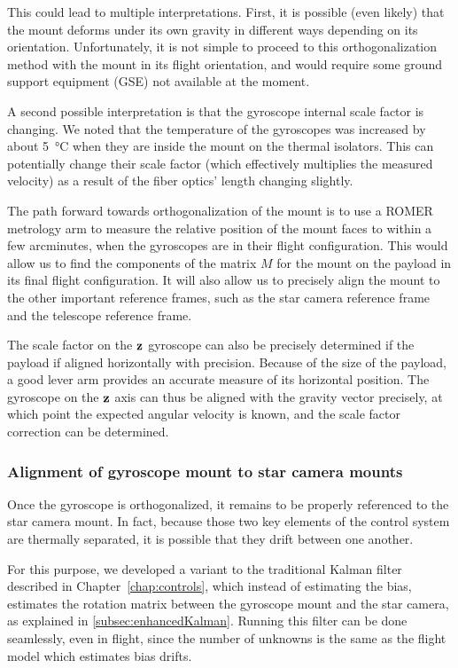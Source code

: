 This could lead to multiple interpretations. First, it is possible (even likely) that the mount deforms under its own gravity in different ways depending on its orientation. Unfortunately, it is not simple to proceed to this orthogonalization method with the mount in its flight orientation, and would require some ground support equipment (GSE) not available at the moment. 

A second possible interpretation is that the gyroscope internal scale factor is changing. We noted that the temperature of the gyroscopes was increased by about \SI{5}{\degreeCelsius} when they are inside the mount on the thermal isolators. This can potentially change their scale factor (which effectively multiplies the measured velocity) as a result of the fiber optics' length changing slightly. 

The path forward towards orthogonalization of the mount is to use a ROMER metrology arm to measure the relative position of the mount faces to within a few arcminutes, when the gyroscopes are in their flight configuration. This would allow us to find the components of the matrix $M$ for the mount on the payload in its final flight configuration. It will also allow us to precisely align the mount to the other important reference frames, such as the star camera reference frame and the telescope reference frame.

The scale factor on the $\textrm{\textbf{z}}$ gyroscope can also be precisely determined if the payload if aligned horizontally with precision. Because of the size of the payload, a good lever arm provides an accurate measure of its horizontal position. The gyroscope on the $\textrm{\textbf{z}}$ axis can thus be aligned with the gravity vector precisely, at which point the expected angular velocity is known, and the scale factor correction can be determined.


\subsubsection{Alignment of gyroscope mount to star camera mounts}

Once the gyroscope is orthogonalized, it remains to be properly referenced to the star camera mount. In fact, because those two key elements of the control system are thermally separated, it is possible that they drift between one another. 

For this purpose, we developed a variant to the traditional Kalman filter described in Chapter~\ref{chap:controls}, which instead of estimating the bias, estimates the rotation matrix between the gyroscope mount and the star camera, as explained in \ref{subsec:enhancedKalman}. Running this filter can be done seamlessly, even in flight, since the number of unknowns is the same as the flight model which estimates bias drifts. 







